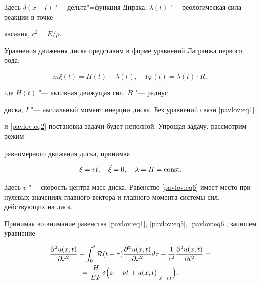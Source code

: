 Здесь $\delta ( x-l )$ "--- дельта"=функция Дирака, $\lambda

( t )$ "--- реологическая сила реакции в точке

касания, $c^2=E/\rho$.



Уравнения движения диска представим в форме уравнений Лагранжа первого рода:

\begin{equation}

\label{pavlov:eq5}

m\ddot {\xi }( t )=H( t )-\lambda ( t ),

\quad

I\ddot {\varphi }( t )=\lambda ( t )\cdot R,

\end{equation}

где $H( t )$ "--- активная движущая сил, $R$ "--- радиус

диска, $I$ "--- аксиальный момент инерции диска. Без уравнений связи \eqref{pavlov:eq1}

и \eqref{pavlov:eq2} постановка задачи будет неполной. Упрощая задачу, рассмотрим режим

равномерного движения диска, принимая

\begin{equation}

\label{pavlov:eq6}

\xi = v  t,

\quad

\ddot {\xi }=0,

\quad

\lambda =H={\rm const}.

\end{equation}

Здесь $ v  $ "--- скорость центра масс диска. Равенство \eqref{pavlov:eq6} имеет место при нулевых значениях главного вектора и главного момента системы сил, действующих на диск.



Принимая во внимание равенства \eqref{pavlov:eq1}, \eqref{pavlov:eq5}, \eqref{pavlov:eq6}, запишем уравнение

\begin{multline}

\label{pavlov:eq7}

\frac{\partial^2u(x,t)}{\partial x^2}-\int_0^t \mathcal{R} ( t-\tau )\frac{\partial ^2u( x,t)}{\partial

x^2}d\tau  -\frac{1}{c^2}\frac{\partial ^2u( x,t )}{\partial

t^2}= \\

 =\frac{H}{EF}\delta \Bigl(x- v  t+u(x,t)\Big|_{x= v  t}\Bigr).

\end{multline}



